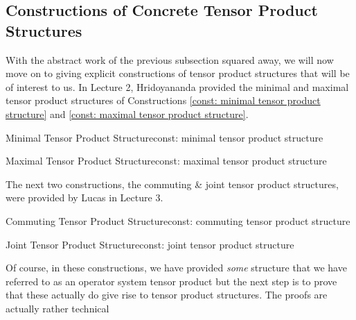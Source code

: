 \documentclass[main.tex]{subfiles}
\begin{document}
\subsection{Constructions of Concrete Tensor Product Structures}
\label{subsec:tensor_products_of_operator_systems_II}


With the abstract work of the previous subsection squared away, we will now move on to giving explicit constructions of tensor product structures that will be of interest to us. In Lecture 2, Hridoyananda provided the minimal and maximal tensor product structures of 
Constructions \ref{const: minimal tensor product structure} and \ref{const: maximal tensor product structure}.

\begin{construction}{Minimal Tensor Product Structure}{const: minimal tensor product structure}

\end{construction}

\begin{construction}{Maximal Tensor Product Structure}{const: maximal tensor product structure}

\end{construction}

The next two constructions, the commuting \& joint tensor product structures, were provided by Lucas in Lecture 3. 

\begin{construction}{Commuting Tensor Product Structure}{const: commuting tensor product structure}

\end{construction}

\begin{construction}{Joint Tensor Product Structure}{const: joint tensor product structure}

\end{construction}


Of course, in these constructions, we have provided \emph{some} structure that we have referred to as an operator system tensor product but the next step is to prove that these actually do give rise to tensor product structures. The proofs are actually rather technical 
\end{document}
